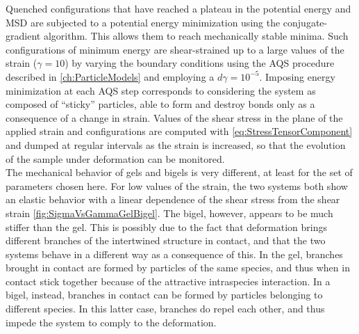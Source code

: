 Quenched configurations that have reached a plateau in the potential energy and MSD are subjected to a potential energy minimization using the conjugate-gradient algorithm. This allows them to reach mechanically stable minima. Such configurations of minimum energy are shear-strained up to a large values of the strain ($\gamma = 10$) by varying the boundary conditions using the AQS procedure described in \autoref{ch:ParticleModels} and employing a $d\gamma = 10^{-5}$. Imposing energy minimization at each AQS step corresponds to considering the system as composed of ``sticky'' particles, able to form and destroy bonds only as a consequence of a change in strain.
Values of the shear stress in the plane of the applied strain and configurations are computed with \autoref{eq:StressTensorComponent} and dumped at regular intervals as the strain is increased, so that the evolution of the sample under deformation can be monitored. \\
The mechanical behavior of gels and bigels is very different, at least for the set of parameters chosen here. For low values of the strain, the two systems both show an elastic behavior with a linear dependence of the shear stress from the shear strain \autoref{fig:SigmaVsGammaGelBigel}. The bigel, however, appears to be much stiffer than the gel. This is possibly due to the fact that deformation brings different branches of the intertwined structure in contact, and that the two systems behave in a different way as a consequence of this. In the gel, branches brought in contact are formed by particles of the same species, and thus when in contact stick together because of the attractive intraspecies interaction. In a bigel, instead, branches in contact can be formed by particles belonging to different species. In this latter case, branches do repel each other, and thus impede the system to comply to the deformation.
